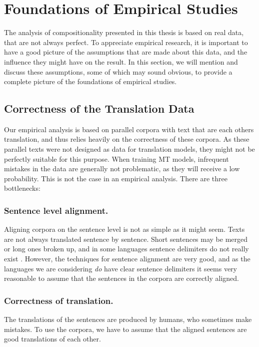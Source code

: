 \documentclass{report}
\begin{document}
\section{Foundations of Empirical Studies}

The analysis of compositionality presented in this thesis is based on real data, that are not always perfect. To appreciate empirical research, it is important to have a good picture of the assumptions that are made about this data, and the influence they might have on the result. In this section, we will mention and discuss these assumptions, some of which may sound obvious, to provide a complete picture of the foundations of empirical studies.


\subsection{Correctness of the Translation Data}

Our empirical analysis is based on parallel corpora with text that are each others translation, and thus relies heavily on the correctness of these corpora. As these parallel texts were not designed as data for translation models, they might not be perfectly suitable for this purpose. When training MT models, infrequent mistakes in the data are generally not problematic, as they will receive a low probability. This is not the case in an empirical analysis. There are three bottlenecks:

\subsubsection{Sentence level alignment.}
Aligning corpora on the sentence level is not as simple as it might seem. Texts are not always translated sentence by sentence. Short sentences may be merged or long ones broken up, and in some languages sentence delimiters do not really exist \citep[p.55]{koehn2008statistical}. However, the techniques for sentence alignment are very good, and as the languages we are considering \textit{do} have clear sentence delimiters it seems very reasonable to assume that the sentences in the corpora are correctly aligned.

\subsubsection{Correctness of translation.}
The translations of the sentences are produced by humans, who sometimes make mistakes. To use the corpora, we have to assume that the aligned sentences are good translations of each other.
\end{document}

